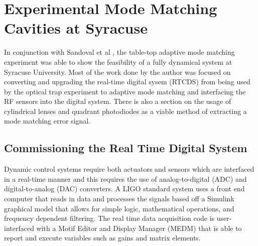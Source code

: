 \chapter{Experimental Mode Matching Cavities at Syracuse}
In conjunction with Sandoval et al \cite{Fabian_Thesis}, the table-top adaptive mode matching experiment was able to show the feasibility of a fully dynamical system at Syracuse University.  Most of the work done by the author was focused on converting and upgrading the real-time digital sysem (RTCDS) from being used by the optical trap experiment \cite{OpticalTrap} to adaptive mode matching and interfacing the RF sensors into the digital system.  There is also a section on the usage of cylindrical lenses and quadrant photodiodes as a viable method of extracting a mode matching error signal.

\section{Commissioning the Real Time Digital System}
	Dynamic control systems require both actuators and sensors which are interfaced in a real-time manner and this requires the use of analog-to-digital (ADC) and digital-to-analog (DAC) converters.  A LIGO standard system uses a front end computer that reads in data and processes the signals based off a Simulink graphical model that allows for simple logic, mathematical operations, and frequency dependent filtering.  The real time data acquisition code is user-interfaced with a Motif Editor and Display Manager (MEDM) that is able to report and execute variables such as gains and matrix elements.
	

